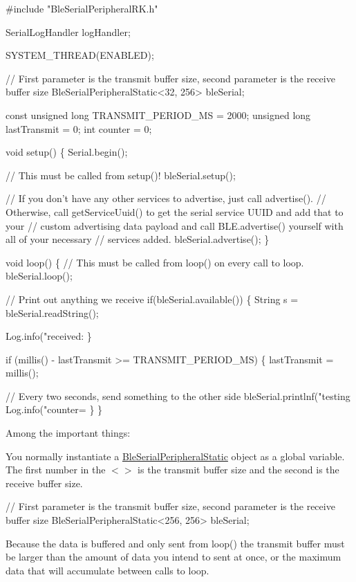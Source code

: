\begin{DoxyCode}
#include "BleSerialPeripheralRK.h"

SerialLogHandler logHandler;

SYSTEM\_THREAD(ENABLED);

// First parameter is the transmit buffer size, second parameter is the receive buffer size
BleSerialPeripheralStatic<32, 256> bleSerial;

const unsigned long TRANSMIT\_PERIOD\_MS = 2000;
unsigned long lastTransmit = 0;
int counter = 0;


void setup() \{
    Serial.begin();

    // This must be called from setup()!
    bleSerial.setup();

    // If you don't have any other services to advertise, just call advertise().
    // Otherwise, call getServiceUuid() to get the serial service UUID and add that to your
    // custom advertising data payload and call BLE.advertise() yourself with all of your necessary
    // services added.
    bleSerial.advertise();
\}

void loop() \{
    // This must be called from loop() on every call to loop.
    bleSerial.loop();

    // Print out anything we receive
    if(bleSerial.available()) \{
        String s = bleSerial.readString();

        Log.info("received: %
    \}

    if (millis() - lastTransmit >= TRANSMIT\_PERIOD\_MS) \{
        lastTransmit = millis();

        // Every two seconds, send something to the other side
        bleSerial.printlnf("testing %
        Log.info("counter=%
    \}
\}
\end{DoxyCode}


Among the important things\+:

You normally instantiate a \mbox{\hyperlink{class_ble_serial_peripheral_static}{Ble\+Serial\+Peripheral\+Static}} object as a global variable. The first number in the $<$$>$ is the transmit buffer size and the second is the receive buffer size.


\begin{DoxyCode}
// First parameter is the transmit buffer size, second parameter is the receive buffer size
BleSerialPeripheralStatic<256, 256> bleSerial;
\end{DoxyCode}


Because the data is buffered and only sent from loop() the transmit buffer must be larger than the amount of data you intend to sent at once, or the maximum data that will accumulate between calls to loop.

